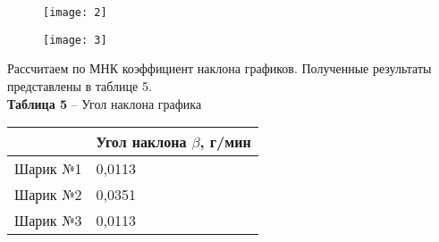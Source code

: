 \documentclass[12pt,a4paper]{article}
\begin{document}
        \begin{figure}[h!]
        	\begin{center}
        		\texttt{[image: 2]}\\
            	{\scriptsize
            	\begin{center}
            	\hspace{69pt}{Рисунок 3 -- График зависимости массы шарика с грузом от времени в 2 измерении}
            	\end{center}}
        	\end{center}
            \label{scheme1}
        \end{figure}

        \begin{figure}[h!]
        	\begin{center}
        		\texttt{[image: 3]}\\
            	{\scriptsize
            	\begin{center}
            	\hspace{69pt}{Рисунок 4 -- График зависимости массы шарика с грузом от времени в 3 измерении}
        	\end{center}}
        	\end{center}
            \label{scheme1}
        \end{figure}

        \begin{table}[!h]
        \begin{flushleft}
        Рассчитаем по МНК коэффициент наклона графиков. Полученные результаты представлены в таблице 5.\\
       		\hspace{140}\textbf{Таблица 5} -- Угол наклона графика \\
        \end{flushleft}
             \begin{center}
                \begin{tabular}{ | l | l |}
                \hline
                           &   Угол наклона $\beta$, г/мин\\
                \hline
                Шарик №1    &    0,0113      \\
                \hline
                Шарик №2    &    0,0351      \\
                \hline
                Шарик №3    &    0,0113      \\
                \hline
                \end{tabular}
            \end{center}
        \end{table}
       
\end{document}
